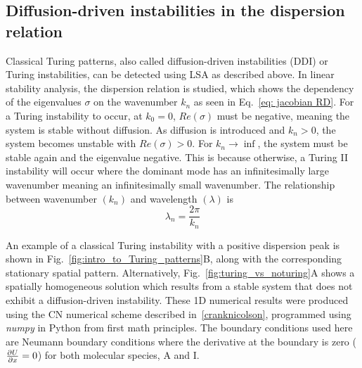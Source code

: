 \subsection{Diffusion-driven instabilities in the dispersion relation}
Classical Turing patterns, also called diffusion-driven instabilities (DDI) or Turing instabilities, can be detected using LSA as described above.
In linear stability analysis, the dispersion relation is studied, which shows the dependency of the eigenvalues $\sigma$ on the wavenumber $k_{n}$ as seen in Eq.~\ref{eq: jacobian RD}.
For a Turing instability to occur, at $k_{0}=0$, $Re(\sigma)$ must be negative, meaning the system is stable without diffusion.
As diffusion is introduced and $k_n>0$, the system becomes unstable with $Re(\sigma)>0$.
For $k_n \rightarrow \inf$, the system must be stable again and the eigenvalue negative.
This is because otherwise, a Turing II instability will occur where the dominant mode has an infinitesimally large wavenumber meaning an infinitesimally small wavenumber.
The relationship between wavenumber $(k_{n})$ and wavelength $(\lambda)$ is
\begin{equation}
    \lambda_n = \frac{2 \pi}{k_n}
    \label{eq:wavelength_wavenumber}
\end{equation}

An example of a classical Turing instability with a positive dispersion peak is shown in Fig.~\ref{fig:intro_to_Turing_patterns}B, along with the corresponding stationary spatial pattern.
Alternatively, Fig.~\ref{fig:turing_vs_noturing}A shows a spatially homogeneous solution which results from a stable system that does not exhibit a diffusion-driven instability.
These 1D numerical results were produced using the \acrfull{CN} numerical scheme described in~\ref{cranknicolson}, programmed using \textit{numpy} in Python from first math principles.
The boundary conditions used here are Neumann boundary conditions where the derivative at the boundary is zero ($\pdv{U}{x}=0$) for both molecular species, A and I.

